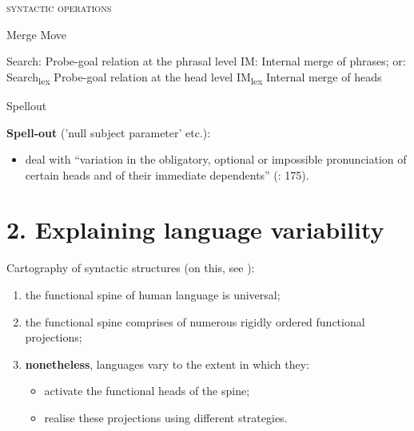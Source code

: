 \documentclass[fleqn,10pt]{wlscirep}
\begin{document}
\begin{exe}
    \ex \textsc{syntactic operations}
        \begin{xlist}
            \ex Merge
            \ex Move
                \begin{xlist}
                    \ex Search:	Probe-goal relation at the phrasal level
                    \ex IM:	Internal merge of phrases; or:
                    \ex Search\textsubscript{lex}	Probe-goal relation at the head level
                    \ex IM\textsubscript{lex}	Internal merge of heads
                \end{xlist}
            \ex Spellout
        \end{xlist}
    \end{exe}

\noindent\textbf{Spell-out} ('null subject parameter' etc.): 
\begin{itemize}
    \item[\ding{227}] \vspace*{-2mm} deal with “variation in the obligatory, optional or impossible pronunciation of certain heads and of their immediate dependents” (\citealt{rizzi2017}: 175). 
\end{itemize}

\section*{2. Explaining language variability}

Cartography of syntactic structures (on this, see \citealt{cinquerizzi2010,rizzicinque2016}):
\begin{enumerate}
    \item \vspace*{-2mm} the functional spine of human language is universal;
    \item \vspace*{-2mm} the functional spine comprises of numerous rigidly ordered functional projections;
    \item \vspace*{-2mm} \textbf{nonetheless}, languages vary to the extent in which they:
        \begin{itemize}
            \item[\ding{227}] \vspace*{-2mm} activate the functional heads of the spine;
            \item[\ding{227}] \vspace*{-2mm} realise these projections using different strategies. 
        \end{itemize}
\end{enumerate}
\end{document}
